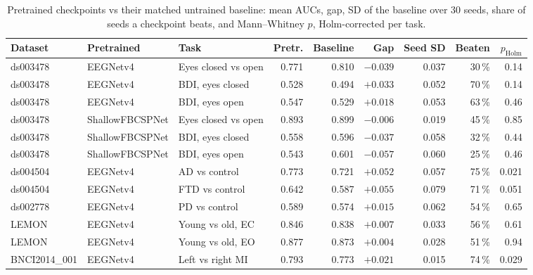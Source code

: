 \documentclass[11pt]{article}
\begin{document}
\begin{table}[t]
\centering\footnotesize\setlength{\tabcolsep}{4pt}
\caption{Pretrained checkpoints vs their matched untrained baseline: mean AUCs, gap, SD of the
baseline over 30 seeds, share of seeds a checkpoint beats, and Mann--Whitney $p$, Holm-corrected
per task.}
\label{tab:matched}
\begin{tabular}{@{}lllrrrrrr@{}}
\toprule
Dataset & Pretrained & Task & Pretr. & Baseline & Gap & Seed SD & Beaten & $p_\text{Holm}$ \\
\midrule
ds003478 & EEGNetv4 & Eyes closed vs open & 0.771 & 0.810 & $-0.039$ & 0.037 & 30\,\% & 0.14 \\
ds003478 & EEGNetv4 & BDI, eyes closed & 0.528 & 0.494 & $+0.033$ & 0.052 & 70\,\% & 0.14 \\
ds003478 & EEGNetv4 & BDI, eyes open & 0.547 & 0.529 & $+0.018$ & 0.053 & 63\,\% & 0.46 \\
ds003478 & ShallowFBCSPNet & Eyes closed vs open & 0.893 & 0.899 & $-0.006$ & 0.019 & 45\,\% & 0.85 \\
ds003478 & ShallowFBCSPNet & BDI, eyes closed & 0.558 & 0.596 & $-0.037$ & 0.058 & 32\,\% & 0.44 \\
ds003478 & ShallowFBCSPNet & BDI, eyes open & 0.543 & 0.601 & $-0.057$ & 0.060 & 25\,\% & 0.46 \\
ds004504 & EEGNetv4 & AD vs control & 0.773 & 0.721 & $+0.052$ & 0.057 & 75\,\% & 0.021 \\
ds004504 & EEGNetv4 & FTD vs control & 0.642 & 0.587 & $+0.055$ & 0.079 & 71\,\% & 0.051 \\
ds002778 & EEGNetv4 & PD vs control & 0.589 & 0.574 & $+0.015$ & 0.062 & 54\,\% & 0.65 \\
LEMON & EEGNetv4 & Young vs old, EC & 0.846 & 0.838 & $+0.007$ & 0.033 & 56\,\% & 0.61 \\
LEMON & EEGNetv4 & Young vs old, EO & 0.877 & 0.873 & $+0.004$ & 0.028 & 51\,\% & 0.94 \\
BNCI2014\_001 & EEGNetv4 & Left vs right MI & 0.793 & 0.773 & $+0.021$ & 0.015 & 74\,\% & 0.029 \\
\bottomrule
\end{tabular}
\end{table}
\end{document}
